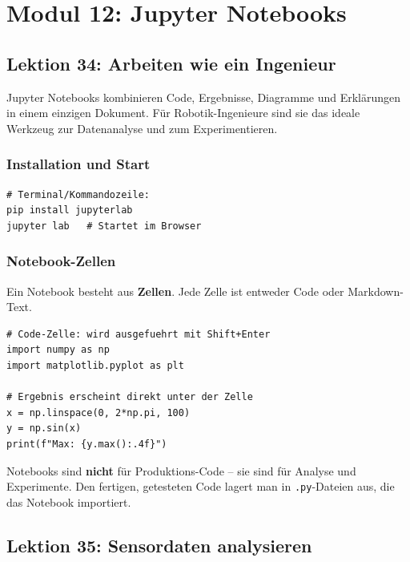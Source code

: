 \chapter{Modul 12: Jupyter Notebooks}

\section{Lektion 34: Arbeiten wie ein Ingenieur}

Jupyter Notebooks kombinieren Code, Ergebnisse, Diagramme und Erklärungen in einem einzigen Dokument. Für Robotik-Ingenieure sind sie das ideale Werkzeug zur Datenanalyse und zum Experimentieren.

\subsection*{Installation und Start}

\begin{lstlisting}
# Terminal/Kommandozeile:
pip install jupyterlab
jupyter lab   # Startet im Browser
\end{lstlisting}

\subsection*{Notebook-Zellen}

Ein Notebook besteht aus \textbf{Zellen}. Jede Zelle ist entweder Code oder Markdown-Text.

\begin{lstlisting}
# Code-Zelle: wird ausgefuehrt mit Shift+Enter
import numpy as np
import matplotlib.pyplot as plt

# Ergebnis erscheint direkt unter der Zelle
x = np.linspace(0, 2*np.pi, 100)
y = np.sin(x)
print(f"Max: {y.max():.4f}")
\end{lstlisting}

\begin{merksatz}
Notebooks sind \textbf{nicht} für Produktions-Code -- sie sind für Analyse und Experimente. Den fertigen, getesteten Code lagert man in \texttt{.py}-Dateien aus, die das Notebook importiert.
\end{merksatz}

\section{Lektion 35: Sensordaten analysieren}

